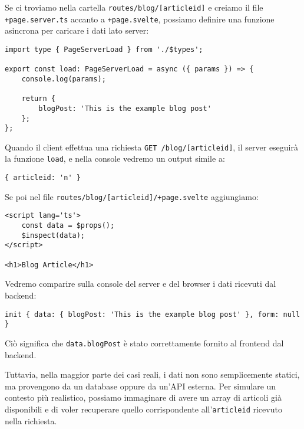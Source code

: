 \documentclass[12pt]{article}
\begin{document}
Se ci troviamo nella cartella \texttt{routes/blog/[articleid]}
e creiamo il file \texttt{+page.server.ts} accanto a
\texttt{+page.svelte}, possiamo definire una funzione asincrona
per caricare i dati lato server:

\begin{verbatim}
import type { PageServerLoad } from './$types';

export const load: PageServerLoad = async ({ params }) => {
    console.log(params);

    return {
        blogPost: 'This is the example blog post'
    };
};
\end{verbatim}

Quando il client effettua una richiesta \texttt{GET /blog/[articleid]},
il server eseguirà la funzione \texttt{load}, e nella console
vedremo un output simile a:

\begin{verbatim}
{ articleid: 'n' }
\end{verbatim}

Se poi nel file \texttt{routes/blog/[articleid]/+page.svelte}
aggiungiamo:

\begin{verbatim}
<script lang='ts'>
    const data = $props();
    $inspect(data);
</script>

<h1>Blog Article</h1>    
\end{verbatim}

Vedremo comparire sulla console del server e del browser
i dati ricevuti dal backend:

\begin{verbatim}
init { data: { blogPost: 'This is the example blog post' }, form: null }
\end{verbatim}

Ciò significa che \texttt{data.blogPost} è stato
correttamente fornito al frontend dal backend.

Tuttavia, nella maggior parte dei casi reali, i dati non
sono semplicemente statici, ma provengono da un database
oppure da un'API esterna. Per simulare un contesto più
realistico, possiamo immaginare di avere un array di
articoli già disponibili e di voler recuperare quello
corrispondente all'\texttt{articleid} ricevuto nella
richiesta.
\end{document}
